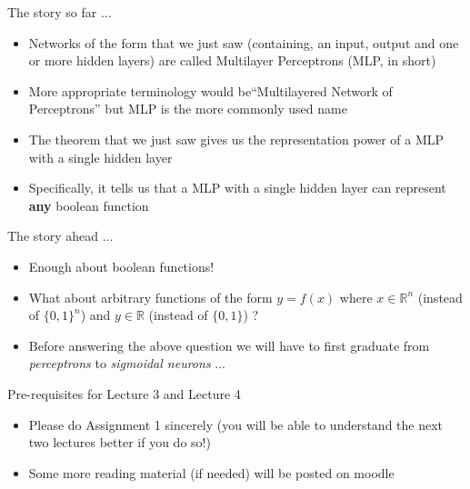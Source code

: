 \documentclass[serif, aspectratio=169]{beamer}
\begin{document}
\begin{frame}
\begin{block}{The story so far ...}
\begin{itemize}\justifying
\item<1-> Networks of the form that we just saw (containing, an input, output and one or more hidden layers) are called Multilayer Perceptrons (MLP, in short)
\item<2-> More appropriate terminology would be``Multilayered Network of Perceptrons'' but MLP is the more commonly used name
\item<3-> The theorem that we just saw gives us the representation power of a MLP with a single hidden layer
\item<4-> Specifically, it tells us that a MLP with a single hidden layer can represent \textbf{any} boolean function
\end{itemize}
\end{block}
\end{frame}

\begin{frame}
\begin{block}{The story ahead ...}
\begin{itemize}\justifying
\item<1-> Enough about boolean functions!
\item<2-> What about arbitrary functions of the form $y=f(x)$ where $x\in \mathbb{R}^n$ (instead of $\{0, 1\}^n$) and $y \in \mathbb{R}$ (instead of $\{0, 1\}$) ?
\item<3-> Before answering the above question we will have to first graduate from \textit{perceptrons} to \textit{sigmoidal neurons} ...
\end{itemize}
\end{block}
\end{frame}

\begin{frame}
\begin{block}{Pre-requisites for Lecture 3 and Lecture 4}
\begin{itemize}\justifying
\item Please do Assignment 1 sincerely (you will be able to understand the next two lectures better if you do so!)
\item Some more reading material (if needed) will be posted on moodle
\end{itemize}
\end{block}
\end{frame}
\end{document}
